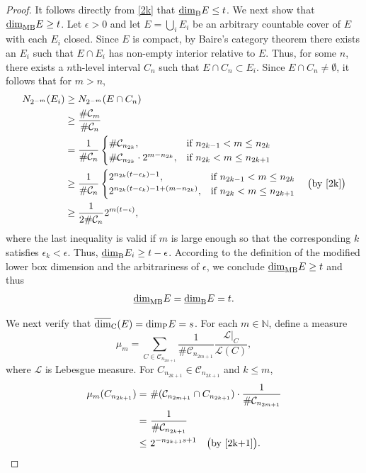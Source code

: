 \documentclass[12pt]{article}
\newcommand{\1}{{\bf 1}}
\newcommand\ucod{\overline{\mbox{\rm dim}}_{\rm C}} %
\newcommand\lbd{\underline{\mbox{\rm dim}}_{\rm B}} %
\newcommand\pkd{\mbox{\rm dim}_{\rm P}} %
\newcommand\mlbd{\underline{\mbox{\rm dim}}_{\rm MB}} %
\begin{document}
\begin{proof}
		It follows directly from \eqref{2k} that $\lbd E\leq t$.
		We next show that $\mlbd E\geq t$.
		Let $\epsilon>0$ and
		let $E=\bigcup_i E_i$ be an arbitrary countable cover of $E$ with each  $E_i$  closed.
		Since $E$ is compact, by Baire's category theorem there  exists an  $E_i$ such that $E \cap E_i$ has non-empty interior relative to $E$.
		Thus, for some $n$, there exists a $n$th-level interval $C_n$ such that $E\cap C_n\subset  E_i$.
		Since $E\cap C_n\neq\emptyset$, it follows that for $m>n$,
		\begin{align*}
			N_{2^{-m}}(E_i)&\geq N_{2^{-m}}(E\cap C_n)\\
			&\geq\frac{\#\mathcal{C}_m}{\#\mathcal{C}_n}\\
			&=\frac{1}{\#\mathcal{C}_n}\begin{cases}
				\#\mathcal{C}_{n_{2k}}, & \text{if } n_{2k-1}<m\leq n_{2k}\\
					\#\mathcal{C}_{n_{2k}}\cdot 2^{m-n_{2k}}, & \text{if } n_{2k}<m\leq n_{2k+1}
			\end{cases}\\
			&\geq\frac{1}{\#\mathcal{C}_n}\begin{cases}
				2^{n_{2k}(t-\epsilon_k)-1}, & \text{if } n_{2k-1}<m\leq n_{2k}\\
				2^{n_{2k}(t-\epsilon_k)-1+(m-n_{2k})}, & \text{if } n_{2k}<m\leq n_{2k+1}
			\end{cases}\quad\big(\text{by } \eqref{2k}\big)\\
			&\geq\frac{1}{2\#\mathcal{C}_n}2^{m(t-\epsilon)},
		\end{align*}
		where the last inequality is valid if $m$ is large enough so that the corresponding $k$ satisfies $\epsilon_k<\epsilon$.
		Thus, $\lbd E_i\geq t-\epsilon$. According to the definition of the modified lower box dimension and the arbitrariness of $\epsilon$, we conclude $\mlbd E\geq t$
		and thus
		\begin{equation*}
			\mlbd E=\lbd E= t.
		\end{equation*}
		
		
		
		We next  verify that  $\ucod (E)= \pkd E = s$. For each $m\in \mathbb{N}$, define a measure 
		\begin{equation*}
			\mu_m= \sum_{C\in\mathcal{C}_{n_{2m+1}}}\frac{1}{\#\mathcal{C}_{n_{2m+1}}}\frac{\mathcal{L}|_C}{\mathcal{L}(C)},
		\end{equation*}
		where $\mathcal{L}$ is Lebesgue measure.
		For  $C_{n_{2k+1}}\in\mathcal{C}_{n_{2k+1}}$ and $k\leq m$, 
			\begin{align}\label{mumc}
			\mu_m(C_{n_{2k+1}})
			=&\ \#(\mathcal{C}_{n_{2m+1}}\cap C_{n_{2k+1}})\cdot\frac{1}{\#\mathcal{C}_{n_{2m+1}}}\notag\\
			=&\ \frac{1}{\#\mathcal{C}_{n_{2k+1}}}\notag\\
			\leq&\ 2^{-n_{2k+1}s+1}\quad\big(\text{by } \eqref{2k+1}\big).
		\end{align}	
		

\end{proof}
\end{document}
